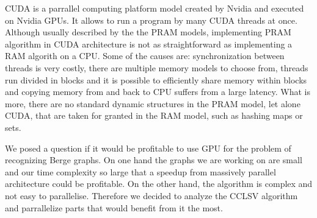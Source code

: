 CUDA is a parrallel computing platform model created by Nvidia and executed on Nvidia GPUs. It allows to run a program  by many CUDA threads at once. Although usually described by the the PRAM models, implementing PRAM algorithm in CUDA architecture is not as straightforward as implementing a RAM algorith on a CPU. Some of the causes are: synchronization between threads is very costly, there are multiple memory models to choose from, threads run divided in blocks and it is possible to efficiently share memory within blocks and copying memory from and back to CPU suffers from a large latency. What is more, there are no standard dynamic structures in the PRAM model, let alone CUDA, that are taken for granted in the RAM model, such as hashing maps or sets. 


We posed a question if it would be profitable to use GPU for the problem of recognizing Berge graphs. On one hand the graphs we are working on are small and our time complexity so large that a speedup from massively parallel architecture could be profitable. On the other hand, the algorithm is complex and not easy to parallelise. Therefore we decided to analyze the  CCLSV algorithm and parrallelize parts that would benefit from it the most.





